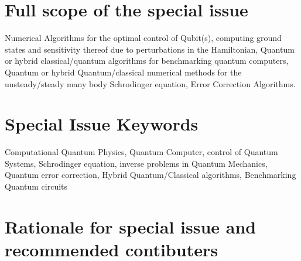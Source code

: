 \documentclass[]{article}
\begin{document}
 
\section{Full scope of the special issue }

Numerical Algorithms for the optimal control of Qubit(s), computing ground states and sensitivity thereof due to perturbations in the Hamiltonian, Quantum or hybrid classical/quantum algorithms for benchmarking quantum computers, Quantum or hybrid Quantum/classical numerical methods for the unsteady/steady many body Schrodinger equation, Error Correction Algorithms.

\section{Special Issue Keywords }

Computational Quantum Physics, Quantum Computer, control of Quantum Systems, Schrodinger equation, inverse problems in Quantum Mechanics, Quantum error correction, Hybrid Quantum/Classical algorithms, Benchmarking Quantum circuits

\section{Rationale for special issue and recommended contibuters}

\begin{comment}

\cite{BLATT1967382}
``Practical points concerning the solution of the Schrödinger equation''
\cite{FEIT1982412}
``Solution of the Schrödinger equation by a spectral method''
\cite{https://doi.org/10.1002/andp.19273892002}
``Zur Quantentheorie der Molekeln''
\cite{wang2020localization}
``Localization and delocalization of light in photonic moir{\'e} lattices''
``Approximating spectral densities of large matrices''
\cite{ramkarthik2021numerical}
``Numerical recipes in quantum information theory and quantum computing: an adventure in FORTRAN 90''
\cite{yeomans1988theory}
``The theory and application of axial Ising models''
\cite{milburn2000ion}
``Ion trap quantum computing with warm ions''

\cite{shastri2021photonics}
``Photonics for artificial intelligence and neuromorphic computing''

\cite{wanjura2024fully}
``Fully nonlinear neuromorphic computing with linear wave scattering''
\cite{de2024spin}
``A spin-optical quantum computing architecture''
\cite{heurtel2023perceval}
``Perceval: A software platform for discrete variable photonic quantum computing''
\cite{wiebe2014quantum}
``Quantum deep learning''

\end{comment}
\end{document}

